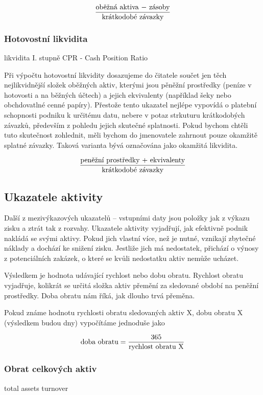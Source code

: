 $$\dfrac{\text{oběžná aktiva $-$ zásoby}}{\text{krátkodobé závazky}}$$

\subsubsection{Hotovostní likvidita}
likvidita I. stupně
CPR - Cash Position Ratio

Při výpočtu hotovostní likvidity dosazujeme do čitatele součet jen těch nejlikvidnější složek oběžných aktiv, kterými jsou pěněžní prostředky (peníze v hotovosti a na běžných účtech) a jejich ekvivalenty (například šeky nebo obchdovatlné cenné papíry).
Přestože tento ukazatel nejlépe vypovídá o platební schopnosti podniku k určitému datu, nebere v potaz strkuturu krátkodobých závazků, především z pohledu jejich skutečné splatnosti\cite{mendelu}. Pokud bychom chtěli tuto skutečnost zohlednit, měli bychom do jmenovatele zahrnout pouze okamžitě splatné závazky. Taková varianta bývá označována jako okamžitá likvidita.


$$\dfrac{\text{peněžní prostředky $+$ ekvivalenty}}{\text{krátkodobé závazky}}$$








\subsection{Ukazatele aktivity}
Další z mezivýkazových ukazatelů -- vstupními daty jsou položky jak z výkazu zisku a ztrát tak z rozvahy. Ukazatele aktivity vyjadřují, jak efektivně podnik nakládá se svými aktivy. Pokud jich vlastní více, než je nutné, vznikají zbytečné náklady a dochází ke snižení zisku. Jestliže jich má nedostatek, přichází o výnosy z potenciálních zakázek, o které se kvůli nedostatku aktiv nemůže ucházet.

Výsledkem je hodnota udávající rychlost nebo dobu obratu. Rychlost obratu vyjadřuje, kolikrát se určitá složka aktiv přemění za sledované období na peněžní prostředky. Doba obratu nám říká, jak dlouho trvá přeměna.

Pokud známe hodnotu rychlosti obratu sledovaných aktiv X, dobu obratu X (výsledkem budou dny) vypočítáme jednoduše jako 

$$\text{doba obratu} = \dfrac{\text{365}}{\text{rychlost obratu X}}$$

\subsubsection{Obrat celkových aktiv}
total assets turnover

